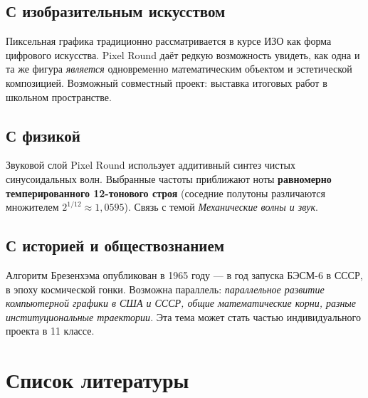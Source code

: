 \documentclass[12pt,a4paper]{scrartcl}
\newcommand{\acc}[1]{\textcolor{accent}{\textbf{#1}}}
\begin{document}
\subsection{С изобразительным искусством}
Пиксельная графика традиционно рассматривается в курсе ИЗО как форма цифрового искусства. Pixel Round даёт редкую возможность увидеть, как одна и та же фигура \emph{является} одновременно математическим объектом и эстетической композицией. Возможный совместный проект: выставка итоговых работ в школьном пространстве.

\subsection{С физикой}
Звуковой слой Pixel Round использует аддитивный синтез чистых синусоидальных волн. Выбранные частоты приближают ноты \acc{равномерно темперированного 12-тонового строя} (соседние полутоны различаются множителем $2^{1/12} \approx 1{,}0595$). Связь с темой \emph{Механические волны и звук}.

\subsection{С историей и обществознанием}
Алгоритм Брезенхэма опубликован в 1965 году --- в год запуска БЭСМ-6 в СССР, в эпоху космической гонки. Возможна параллель: \emph{параллельное развитие компьютерной графики в США и СССР, общие математические корни, разные институциональные траектории}. Эта тема может стать частью индивидуального проекта в 11 классе.

\section{Список литературы}
\end{document}

